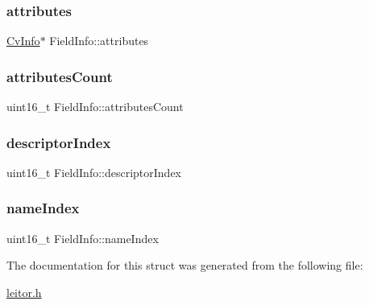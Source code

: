 \subsubsection{\texorpdfstring{attributes}{attributes}}
{\footnotesize\ttfamily \hyperlink{structCvInfo}{Cv\+Info}$\ast$ Field\+Info\+::attributes}

\mbox{\label{structFieldInfo_ad8eae2b3a0fccae8700ca53263983c6e}} 
\subsubsection{\texorpdfstring{attributes\+Count}{attributesCount}}
{\footnotesize\ttfamily uint16\+\_\+t Field\+Info\+::attributes\+Count}

\mbox{\label{structFieldInfo_ab6cc30d06db3569171dd6fdcba7add29}} 
\subsubsection{\texorpdfstring{descriptor\+Index}{descriptorIndex}}
{\footnotesize\ttfamily uint16\+\_\+t Field\+Info\+::descriptor\+Index}

\mbox{\label{structFieldInfo_a88ea5c29063df8933d5277e846924b1e}} 
\subsubsection{\texorpdfstring{name\+Index}{nameIndex}}
{\footnotesize\ttfamily uint16\+\_\+t Field\+Info\+::name\+Index}



The documentation for this struct was generated from the following file\+:\begin{DoxyCompactItemize}
\item 
\hyperlink{leitor_8h}{leitor.\+h}\end{DoxyCompactItemize}
